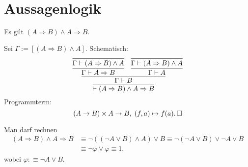 \newpage
\section{Aussagenlogik}

\begin{Satz}\newlinefirst
Es gilt $(A\Rightarrow B)\land A \Rightarrow B$.
\end{Satz}
\begin{Beweis}[Beweis 1]
Sei $\Gamma:=[(A\Rightarrow B)\land A]$. Schematisch:
\[\infer{\vdash (A\Rightarrow B)\land A\Rightarrow B}{
    \infer{\Gamma\vdash B}{
      \infer{\Gamma\vdash A\Rightarrow B}{
        \infer{\Gamma\vdash (A\Rightarrow B)\land A}{}}
      & \infer{\Gamma\vdash A}{
        \infer{\Gamma\vdash (A\Rightarrow B)\land A}{}}}}\]
Programmterm:
\[(A\to B)\times A\to B,\; (f, a)\mapsto f(a).\,\square\]
\end{Beweis}

\begin{Beweis}
Man darf rechnen
\begin{align*}
(A\Rightarrow B)\land A \Rightarrow B &\equiv
\neg ((\neg A\lor B)\land A) \lor B
\equiv\neg (\neg A\lor B) \lor \neg A \lor B\\
&\equiv \neg\varphi\lor\varphi\equiv 1,
\end{align*}
wobei $\varphi :\equiv \neg A\lor B$.\;\qedsymbol
\end{Beweis}

